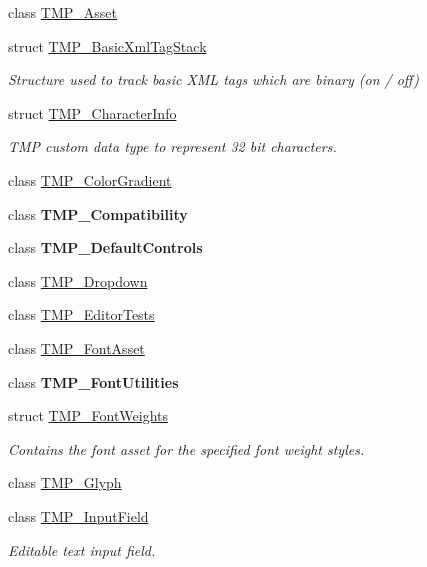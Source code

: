 \begin{DoxyCompactItemize}
\item 
class \mbox{\hyperlink{class_t_m_pro_1_1_t_m_p___asset}{T\+M\+P\+\_\+\+Asset}}
\item 
struct \mbox{\hyperlink{struct_t_m_pro_1_1_t_m_p___basic_xml_tag_stack}{T\+M\+P\+\_\+\+Basic\+Xml\+Tag\+Stack}}
\begin{DoxyCompactList}\small\item\em Structure used to track basic X\+ML tags which are binary (on / off) \end{DoxyCompactList}\item 
struct \mbox{\hyperlink{struct_t_m_pro_1_1_t_m_p___character_info}{T\+M\+P\+\_\+\+Character\+Info}}
\begin{DoxyCompactList}\small\item\em T\+MP custom data type to represent 32 bit characters. \end{DoxyCompactList}\item 
class \mbox{\hyperlink{class_t_m_pro_1_1_t_m_p___color_gradient}{T\+M\+P\+\_\+\+Color\+Gradient}}
\item 
class {\bfseries T\+M\+P\+\_\+\+Compatibility}
\item 
class {\bfseries T\+M\+P\+\_\+\+Default\+Controls}
\item 
class \mbox{\hyperlink{class_t_m_pro_1_1_t_m_p___dropdown}{T\+M\+P\+\_\+\+Dropdown}}
\item 
class \mbox{\hyperlink{class_t_m_pro_1_1_t_m_p___editor_tests}{T\+M\+P\+\_\+\+Editor\+Tests}}
\item 
class \mbox{\hyperlink{class_t_m_pro_1_1_t_m_p___font_asset}{T\+M\+P\+\_\+\+Font\+Asset}}
\item 
class {\bfseries T\+M\+P\+\_\+\+Font\+Utilities}
\item 
struct \mbox{\hyperlink{struct_t_m_pro_1_1_t_m_p___font_weights}{T\+M\+P\+\_\+\+Font\+Weights}}
\begin{DoxyCompactList}\small\item\em Contains the font asset for the specified font weight styles. \end{DoxyCompactList}\item 
class \mbox{\hyperlink{class_t_m_pro_1_1_t_m_p___glyph}{T\+M\+P\+\_\+\+Glyph}}
\item 
class \mbox{\hyperlink{class_t_m_pro_1_1_t_m_p___input_field}{T\+M\+P\+\_\+\+Input\+Field}}
\begin{DoxyCompactList}\small\item\em Editable text input field. \end{DoxyCompactList}\item 

\end{DoxyCompactItemize}
